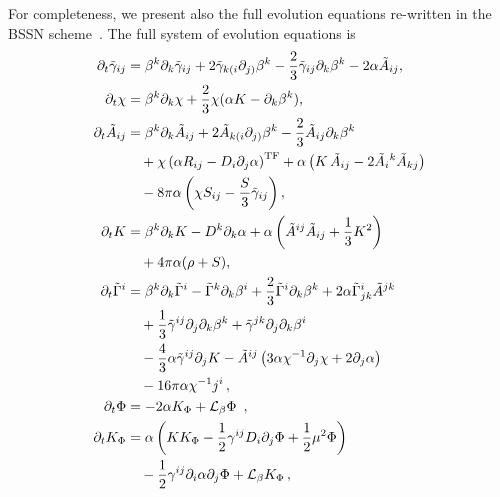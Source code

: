 For completeness, we present also the full evolution equations re-written in the BSSN scheme~\cite{Scalar_Shibata:1995we,Scalar_Baumgarte:1998te}.
The full system of evolution equations is
%
\begin{align}
    \partial_t \tilde{\gamma}_{ij} & = \beta^k \partial_k \tilde{\gamma}_{ij} +
    2\tilde{\gamma}_{k(i} \partial_{j)} \beta^k - \frac{2}{3}
    \tilde{\gamma}_{ij} \partial_k \beta^k -2\alpha \tilde{A}_{ij},  \\
    \partial_t \chi & = \beta^k \partial_k \chi + \frac{2}{3} \chi (\alpha K
    - \partial_k \beta^k),  \\
    \partial_t \tilde{A}_{ij} & = \beta^k \partial_k \tilde{A}_{ij}
      + 2\tilde{A}_{k(i} \partial_{j)} \beta^k
      - \frac{2}{3} \tilde{A}_{ij} \partial_k \beta^k  \notag \\
      & \quad + \chi \left( \alpha R_{ij} - D_i \partial_j \alpha\right)^{\rm
      TF}
      + \alpha \left( K\,\tilde{A}_{ij}
      - 2 \tilde{A}_i{}^k \tilde{A}_{kj} \right) \notag \\
      & \quad - 8 \pi \alpha \left(
          \chi S_{ij} - \frac{S}{3} \tilde \gamma_{ij}
        \right), \\
    \partial_t K & = \beta^k \partial_k K - D^k \partial_k \alpha + \alpha \left(
                   \tilde{A}^{ij} \tilde{A}_{ij} + \frac{1}{3} K^2 \right) \notag \\
    & \quad  + 4 \pi \alpha (\rho + S), \\
    \partial_t \tilde{\Gamma}^i & = \beta^k \partial_k \tilde{\Gamma}^i
       - \tilde{\Gamma}^k \partial_k \beta^i + \frac{2}{3}
    \tilde{\Gamma}^i \partial_k \beta^k + 2 \alpha \tilde{\Gamma}^i_{jk}
                                  \tilde{A}^{jk} \notag \\
                                  & \quad + \frac{1}{3} \tilde{\gamma}^{ij}\partial_j \partial_k
    \beta^k
    + \tilde{\gamma}^{jk} \partial_j \partial_k \beta^i \nonumber \\
    & \quad - \frac{4}{3} \alpha \tilde{\gamma}^{ij} \partial_j K -
    \tilde{A}^{ij} \left( 3 \alpha \chi^{-1} \partial_j \chi + 2\partial_j
      \alpha \right) %
                    \notag \\
    & \quad - 16 \pi \alpha \chi^{-1} j^i \label{eq:tilde-Gamma-evol} \,, \\
%
  \partial_{t} \Phi & = - 2 \alpha K_\Phi + \mathcal{L}_{\beta} \Phi\
                \,, \label{eq:dtPhi-BSSN} \\
%
  \partial_{t} K_\Phi &  = \alpha \left( K K_{\Phi} - \frac{1}{2} \gamma^{ij} D_i \partial_j \Phi
                  + \frac{1}{2} \mu^2 \Phi \right) \nonumber \\
                 & \quad - \frac{1}{2} \gamma^{ij} \partial_i \alpha \partial_j \Phi
                       + \mathcal{L}_{\beta} K_\Phi \,, \label{eq:dtKphi-BSSN}
\end{align}
